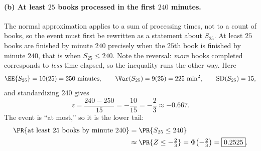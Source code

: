 \documentclass[11pt]{article}
\begin{document}
\paragraph{(b) At least $25$ books processed in the first $240$ minutes.}
The normal approximation applies to a sum of processing times, not to a count of books, so
the event must first be rewritten as a statement about $S_{25}$. At least $25$ books are
finished by minute $240$ precisely when the $25$th book is finished by minute $240$, that
is when $S_{25} \le 240$. Note the reversal: \emph{more} books completed corresponds to
\emph{less} time elapsed, so the inequality runs the other way. Here
\[
  \EE{S_{25}} = 10(25) = 250 \text{ minutes}, \qquad
  \Var(S_{25}) = 9(25) = 225 \text{ min}^{2}, \qquad
  \mathrm{SD}(S_{25}) = 15 ,
\]
and standardizing $240$ gives
\[
  z = \frac{240 - 250}{15} = -\frac{10}{15} = -\frac{2}{3} \approx -0.667 .
\]
The event is ``at most,'' so it is the lower tail:
\begin{align*}
  \PR{\text{at least }25\text{ books by minute }240}
    &= \PR{S_{25} \le 240}\\
    &\approx \PR{Z \le -\tfrac{2}{3}}
     = \Phi\!\left(-\tfrac{2}{3}\right)
     = \boxed{0.2525}.
\end{align*}
\end{document}
